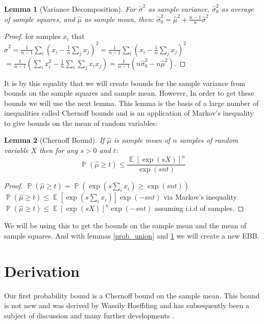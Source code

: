 \documentclass[aap,preprint]{imsart}
\newtheorem{lemma}{Lemma}
\DeclareMathOperator{\E}{\mathbb{E}}
\DeclareMathOperator{\p}{\mathbb{P}}
\begin{document}
\begin{lemma}[Variance Decomposition]\label{variance1}
For $\hat{\sigma}^2$ as sample variance, $\hat{\sigma}_0^2$ as average of sample squares, and $\hat{\mu}$ as sample mean, then:
$ \hat{\sigma}_0^2 = \hat{\mu}^2+\frac{n-1}{n}\hat{\sigma}^2 $
\end{lemma}
\begin{proof}
for samples $x_i$ that\\
$\hat{\sigma}^2=\frac{1}{n-1}\sum_i(x_i-\frac{1}{n}\sum_jx_j)^2 = \frac{1}{n-1}\sum_i(x_i-\frac{1}{n}\sum_jx_j)^2$\\
$=\frac{1}{n-1}(\sum_ix_i^2-\frac{1}{n}\sum_i\sum_jx_ix_j) = \frac{1}{n-1}(n\hat{\sigma}_0^2-n\hat{\mu}^2)$.
\end{proof}

It is by this equality that we will create bounds for the sample variance from bounds on the sample squares and sample mean.
However, In order to get these bounds we will use the next lemma. This lemma is the basis of a large number of inequalities called Chernoff bounds and is an application of Markov's inequality to give bounds on the mean of random variables\cite{hoeffding2}:

\begin{lemma}[Chernoff Bound]\label{chernoff1}
If $\hat{\mu}$ is sample mean of $n$ samples of random variable $X$ then for any $s>0$ and $t$:
$$ \textstyle\p(\hat{\mu}\ge t)\le\frac{\E\left[\exp(sX)\right]^n}{\exp(snt)} $$
\end{lemma}
\begin{proof}
$\p(\hat{\mu}\ge t) = \p(\exp(s\sum_ix_i)\ge \exp(snt))$\\
$\p(\hat{\mu}\ge t) \le \E[\exp(s\sum_ix_i)]\exp(-snt)$ via Markov's inequality \\ 
$\p(\hat{\mu}\ge t) \le \E\left[\exp(sX)\right]^n\exp(-snt)$ assuming i.i.d of samples.
\end{proof}

We will be using this to get the bounds on the sample mean and the mean of sample squares.
And with lemmas \ref{prob_union} and \ref{variance1} we will create a new EBB.

\section{Derivation}\label{derivation}

Our first probability bound is a Chernoff bound on the sample mean. This bound is not new and was derived by Wassily Hoeffding \cite{hoeffding1} and has subsequently been a subject of discussion and many further developments \cite{hoeffding2,Bentkus08boundsfor,Pinelis2014,zbMATH00812598,MR1782937}.
\end{document}
